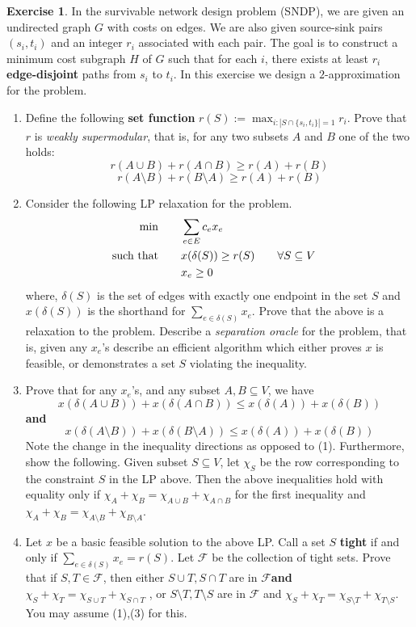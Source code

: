 \documentclass[11pt]{article}
\theoremstyle{definition}
\newtheorem{exercise}{Exercise}
\begin{document}
\begin{exercise}
In the survivable network design problem (SNDP), we are given an undirected graph $G$ with costs on edges. We are also given source-sink pairs $(s_i,t_i)$
and an integer $r_i$ associated with each pair.
The goal is to construct a minimum cost subgraph $H$ of $G$ such that for each $i$, there exists at least $r_i$ {\bf edge-disjoint} paths from $s_i$ to $t_i$.
In this exercise we design a $2$-approximation for the problem.
\begin{enumerate}
\item 
Define the following {\bf set function} $r(S) := \max_{i: |S\cap \{s_i,t_i\}|  = 1} r_i$. Prove that $r$ is {\em weakly supermodular}, that is,
for any two subsets $A$ and $B$ one of the two holds:
\[
r(A \cup B)  + r(A \cap B) \geq r(A) + r(B)
\]
\[
r(A\setminus B) + r(B\setminus A) \geq r(A) + r(B)
\]
\item Consider the following LP relaxation for the problem.
\begin{align}
\min & \qquad \sum_{e\in E} c_ex_e & \notag \\
\textrm{such that} &\qquad  x(\delta(S)) \geq r(S) \qquad \forall S\subseteq V\notag \\
& \qquad x_e \geq 0 \notag
\end{align}
where, $\delta(S)$ is the set of edges with exactly one endpoint in the set $S$ and $x(\delta(S))$ is the shorthand for $\sum_{e\in \delta(S)} x_e$.
Prove that the above is a relaxation to the problem. Describe a {\em separation oracle} for the problem, that is, given any $x_e$'s 
describe an efficient algorithm which either proves $x$ is feasible, or demonstrates a set $S$ violating the inequality.

\item 
Prove that for any $x_e$'s, and any subset $A,B \subseteq V$, we have 
\[
x(\delta(A \cup B))  + x(\delta(A \cap B)) \leq x(\delta(A)) + x(\delta(B))
\]
{\bf and}
\[
x(\delta(A\setminus B)) + x(\delta(B\setminus A)) \leq x(\delta(A)) + x(\delta(B))
\]
Note the change in the inequality directions as opposed to (1).
Furthermore, show the following. Given subset $S\subseteq V$, let $\chi_S$ be the row corresponding to the constraint $S$ in the LP above.
Then the above inequalities hold with equality only if  $\chi_A + \chi_B = \chi_{A\cup B} + \chi_{A\cap B}$ for the first inequality and 
$\chi_A + \chi_B = \chi_{A\setminus B} + \chi_{B\setminus A}$.
\item 
\def\cF{\mathcal{F}}
\def\cL{\mathcal{L}}
Let $x$ be a basic feasible solution to the above LP. Call a set $S$ {\bf tight} if and only if $\sum_{e\in \delta(S)} x_e = r(S)$.
Let $\cF$ be the collection of tight sets. Prove that if $S,T\in \cF$, then either $S\cup T,S\cap T$ are in $\cF${\bf and} $\chi_S + \chi_T = \chi_{S\cup T} + \chi_{S\cap T}$ , or 
$S\setminus T, T\setminus S$ are in $\cF$ and $\chi_S +\chi_T = \chi_{S\setminus T} + \chi_{T\setminus S}$.
You may assume (1),(3) for this.


\end{enumerate}
\end{exercise}
\end{document}
